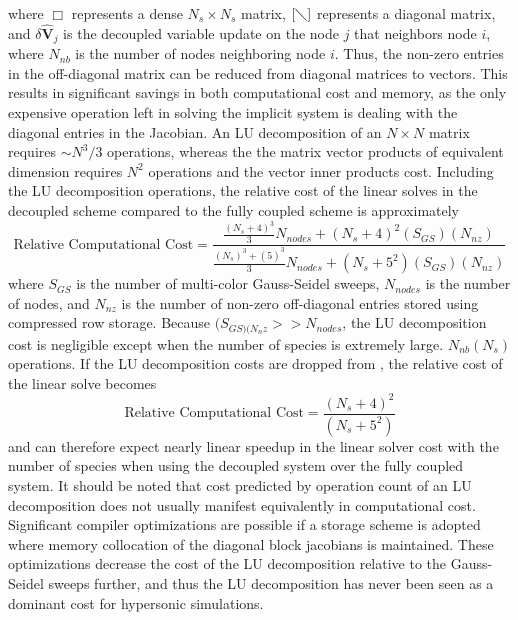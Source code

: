 where $\Box$ represents a dense $N_s \times N_s$ matrix, $[\diagdown]$ represents
a diagonal matrix, and $\delta \mathbf{\hat{V}}_j$  is the decoupled variable
update on the node $j$ that neighbors node $i$, where $N_{nb}$ is the number of
nodes neighboring node $i$.  Thus, the non-zero entries in the off-diagonal
matrix can be reduced from diagonal matrices to vectors.  This results in
significant savings in both computational cost and memory, as the only expensive
operation left in solving the implicit system is dealing with the diagonal
entries in the Jacobian.  An LU decomposition of an $N \times N$ matrix
requires $\sim N^3/3$ operations, whereas the the matrix vector
products of equivalent dimension requires $N^2$ operations and the vector inner
products cost.  Including the LU decomposition operations, the relative cost of
the linear solves in the decoupled scheme compared to the fully coupled scheme
is approximately
\begin{equation}
  \text{Relative Computational Cost} = 
  \frac{
    \frac{\left( N_s + 4 \right)^3}{3} N_{nodes} + \left( N_s + 4 \right)^2(S_{GS})(N_{nz})
  }{
    \frac{(N_s)^3 + (5)^3}{3} N_{nodes} + \left( N_s + 5^2\right)(S_{GS})(N_{nz})
  }
  \label{relative-lu-gs-cost}
\end{equation}
where $S_{GS}$ is the number of multi-color Gauss-Seidel sweeps, $N_{nodes}$ is
the number of nodes, and $N_{nz}$ is the number of non-zero off-diagonal entries
stored using compressed row storage\cite{George}.  Because $(S_{GS)(N_nz} >>
N_{nodes}$, the LU decomposition cost is negligible except when the number of
species is extremely large.  $N_{nb}(N_s)$ operations.  If the LU decomposition
costs are dropped from , the relative cost of the
linear solve becomes
\begin{equation}
  \text{Relative Computational Cost} = 
  \frac{
   \left( N_s + 4 \right)^2
  }{
    \left( N_s + 5^2\right)
  }
  \label{relative-no-lu-gs-cost}
\end{equation}
and can therefore expect nearly linear speedup in the linear solver cost with the
number of species when using the decoupled system over the fully coupled system.
It should be noted that cost predicted by operation count of an LU decomposition
does not usually manifest equivalently in computational cost.  Significant
compiler optimizations are possible if a storage scheme is adopted where memory
collocation of the diagonal block jacobians is maintained.  These optimizations
decrease the cost of the LU decomposition relative to the Gauss-Seidel sweeps
further, and thus the LU decomposition has never been seen as a dominant cost
for hypersonic simulations.

